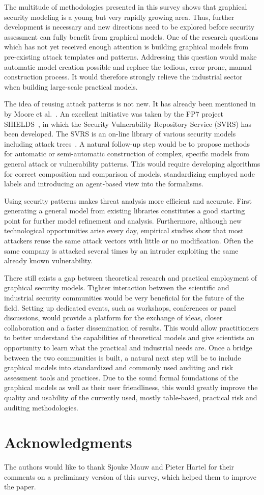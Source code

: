 \documentclass[a4paper]{article}
\begin{document}
The multitude of methodologies presented in this survey shows that graphical
security modeling is a young but very rapidly growing area. Thus, further
development is necessary and new directions need to be explored before security
assessment can fully benefit from graphical models. One of the research
questions which has not yet received enough attention is building graphical
models from pre-existing attack templates and patterns. Addressing this question
would make automatic model creation possible and replace the tedious,
error-prone, manual construction process. It would therefore strongly relieve
the industrial sector when building large-scale practical models. 

The idea of reusing attack patterns is not new. It has already been mentioned
in~ by Moore et al.~\cite{MoElLi}. An excellent initiative was taken by
the FP7 project SHIELDS~\cite{Website_SHIELDS}, in which the Security
Vulnerability Repository Service (SVRS) has been developed. The SVRS is an
on-line library of various security models including attack trees~\cite{SVRS}. 
A natural follow-up step would be to propose methods for automatic or
semi-automatic construction of complex, specific models from general attack or
vulnerability patterns. This would require developing algorithms for correct
composition and comparison of models, standardizing employed node labels and
introducing an agent-based view into the formalisms. 

Using security patterns makes threat analysis more efficient and accurate. First
generating a general model from existing libraries constitutes a good starting
point for further model refinement and analysis. Furthermore, although new
technological opportunities arise every day, empirical studies show that most
attackers reuse the same attack vectors with little or no modification. Often
the same company is attacked several times by an intruder exploiting the same
already known vulnerability.

There still exists a gap between theoretical research and practical employment
of graphical security models. Tighter interaction between the scientific and
industrial security communities would be very beneficial for the future of the
field. Setting up dedicated events, such as workshops, conferences or panel
discussions, would provide a platform for the exchange of ideas, closer
collaboration and a faster dissemination of results. This would allow
practitioners to better understand the capabilities of theoretical models and
give scientists an opportunity to learn what the practical and industrial needs
are. Once a bridge between the two communities is built, a natural next step
will be to include graphical models into standardized and commonly used auditing
and risk assessment tools and practices. Due to the sound formal foundations of 
the graphical models as well as their user friendliness, this would greatly
improve the quality and usability of the currently used, mostly table-based,
practical risk and auditing methodologies.

\section*{Acknowledgments}

The authors would like to thank Sjouke Mauw and Pieter Hartel for their 
comments on a preliminary version of this survey, which helped them to improve 
the paper.

 

\end{document}
